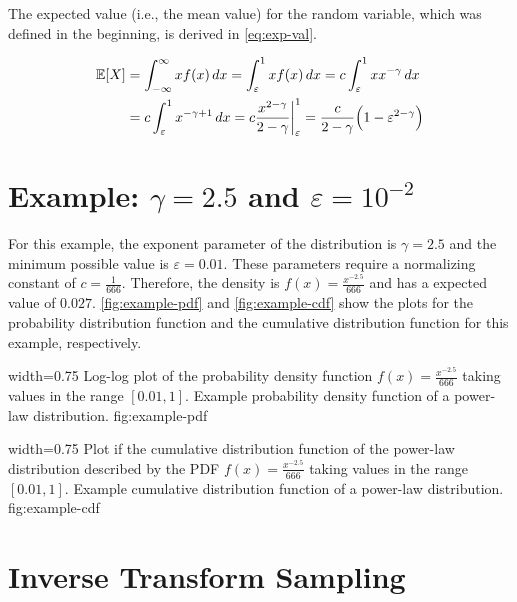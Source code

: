 The expected value (i.e., the mean value) for the random variable, which was defined in the beginning, is derived in \cref{eq:exp-val}.


\begin{align}
	\mathbb{E}[{X}] & = \int_{-\infty}^{\infty} x f(x) \, dx = \int_{\varepsilon}^{1} x f(x) \, dx = c \int_{\varepsilon}^{1} x x^{-\gamma} \, dx \\
	    & = c \int_{\varepsilon}^{1} x^{-\gamma+1} \, dx = c \frac{x^{2-\gamma}}{2-\gamma}  \bigg |_{\varepsilon}^{1} = \frac{c}{2-\gamma} \Big(1 - \varepsilon^{2-\gamma}\Big)
\label{eq:exp-val}
\end{align}



\section{Example: \(\gamma = 2.5\) and \(\varepsilon = 10^{-2}\)}
\label{sec:example}

For this example, the exponent parameter of the distribution is \(\gamma = 2.5\) and the minimum possible value is \(\varepsilon = 0.01\).
These parameters require a normalizing constant of \(c = \frac{1}{666}\).
Therefore, the density is \(f(x) = \frac{x^{-2.5}}{666}\) and has a expected value of \(0.027\).
\cref{fig:example-pdf} and \cref{fig:example-cdf} show the plots for the probability distribution function and the cumulative distribution function for this example, respectively.

      {width=0.75\textwidth}
      {Log-log plot of the probability density function \(f(x) = \frac{x^{-2.5}}{666}\) taking values in the range \([0.01, 1]\).}
      {Example probability density function of a power-law distribution.}
      {fig:example-pdf}

      {width=0.75\textwidth}
      {Plot if the cumulative distribution function of the power-law distribution described by the PDF \(f(x) = \frac{x^{-2.5}}{666}\) taking values in the range \([0.01, 1]\).}
      {Example cumulative distribution function of a power-law distribution.}
      {fig:example-cdf}




\section{Inverse Transform Sampling}
\label{sec:inverse-transform-sampling}

